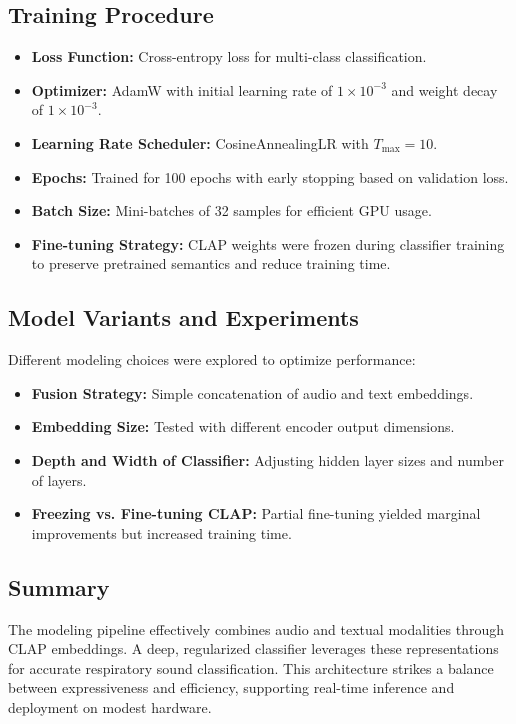 \subsection{Training Procedure}
\begin{itemize}
    \item \textbf{Loss Function:} Cross-entropy loss for multi-class classification.
    \item \textbf{Optimizer:} AdamW with initial learning rate of $1 \times 10^{-3}$ and weight decay of $1 \times 10^{-3}$.
    \item \textbf{Learning Rate Scheduler:} CosineAnnealingLR with $T_{\text{max}} = 10$.
    \item \textbf{Epochs:} Trained for 100 epochs with early stopping based on validation loss.
    \item \textbf{Batch Size:} Mini-batches of 32 samples for efficient GPU usage.
    \item \textbf{Fine-tuning Strategy:} CLAP weights were frozen during classifier training to preserve pretrained semantics and reduce training time.
\end{itemize}

\subsection{Model Variants and Experiments}
Different modeling choices were explored to optimize performance:
\begin{itemize}
    \item \textbf{Fusion Strategy:} Simple concatenation of audio and text embeddings.
    \item \textbf{Embedding Size:} Tested with different encoder output dimensions.
    \item \textbf{Depth and Width of Classifier:} Adjusting hidden layer sizes and number of layers.
    \item \textbf{Freezing vs. Fine-tuning CLAP:} Partial fine-tuning yielded marginal improvements but increased training time.
\end{itemize}

\subsection*{Summary}
The modeling pipeline effectively combines audio and textual modalities through CLAP embeddings. A deep, regularized classifier leverages these representations for accurate respiratory sound classification. This architecture strikes a balance between expressiveness and efficiency, supporting real-time inference and deployment on modest hardware.

